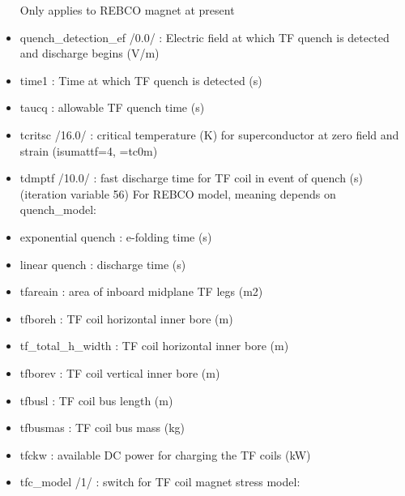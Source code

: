 \documentclass[]{article}
\begin{document}
\begin{itemize}
  Only applies to REBCO magnet at present
\item
  quench\_detection\_ef /0.0/ : Electric field at which TF quench is
  detected and discharge begins (V/m)
\item
  time1 : Time at which TF quench is detected (s)
\item
  taucq : allowable TF quench time (s)
\item
  tcritsc /16.0/ : critical temperature (K) for superconductor at zero
  field and strain (isumattf=4, =tc0m)
\item
  tdmptf /10.0/ : fast discharge time for TF coil in event of quench (s)
  (iteration variable 56) For REBCO model, meaning depends on
  quench\_model:
\item
  exponential quench : e-folding time (s)
\item
  linear quench : discharge time (s)
\item
  tfareain : area of inboard midplane TF legs (m2)
\item
  tfboreh : TF coil horizontal inner bore (m)
\item
  tf\_total\_h\_width : TF coil horizontal inner bore (m)
\item
  tfborev : TF coil vertical inner bore (m)
\item
  tfbusl : TF coil bus length (m)
\item
  tfbusmas : TF coil bus mass (kg)
\item
  tfckw : available DC power for charging the TF coils (kW)
\item
  tfc\_model /1/ : switch for TF coil magnet stress model:


\end{itemize}
\end{document}
